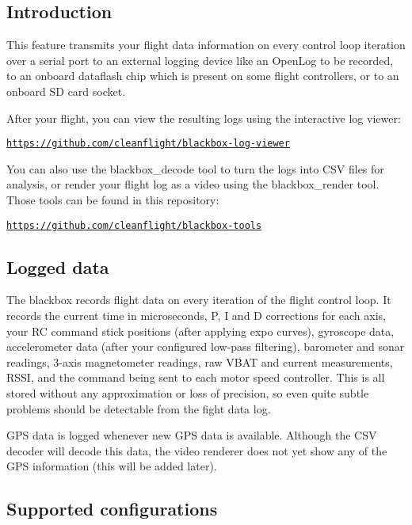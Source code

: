 

\subsection*{Introduction}

This feature transmits your flight data information on every control loop iteration over a serial port to an external logging device like an Open\+Log to be recorded, to an onboard dataflash chip which is present on some flight controllers, or to an onboard S\+D card socket.

After your flight, you can view the resulting logs using the interactive log viewer\+:

\href{https://github.com/cleanflight/blackbox-log-viewer}{\tt https\+://github.\+com/cleanflight/blackbox-\/log-\/viewer}

You can also use the {\ttfamily blackbox\+\_\+decode} tool to turn the logs into C\+S\+V files for analysis, or render your flight log as a video using the {\ttfamily blackbox\+\_\+render} tool. Those tools can be found in this repository\+:

\href{https://github.com/cleanflight/blackbox-tools}{\tt https\+://github.\+com/cleanflight/blackbox-\/tools}

\subsection*{Logged data}

The blackbox records flight data on every iteration of the flight control loop. It records the current time in microseconds, P, I and D corrections for each axis, your R\+C command stick positions (after applying expo curves), gyroscope data, accelerometer data (after your configured low-\/pass filtering), barometer and sonar readings, 3-\/axis magnetometer readings, raw V\+B\+A\+T and current measurements, R\+S\+S\+I, and the command being sent to each motor speed controller. This is all stored without any approximation or loss of precision, so even quite subtle problems should be detectable from the fight data log.

G\+P\+S data is logged whenever new G\+P\+S data is available. Although the C\+S\+V decoder will decode this data, the video renderer does not yet show any of the G\+P\+S information (this will be added later).

\subsection*{Supported configurations}


